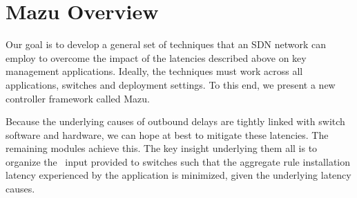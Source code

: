 \section{Mazu Overview}

Our goal is to develop a general set of techniques that an SDN network can
employ to overcome the impact of the latencies described above on key management
applications. Ideally, the techniques must work across all applications,
switches and deployment settings. To this end, we present a new controller framework called Mazu.



Because the underlying causes of outbound delays are tightly linked with
switch software and hardware, we can hope at best to mitigate these
latencies. The remaining modules achieve this. The key insight underlying them
all is to organize the \flowmod\ input provided to switches such that the
aggregate rule installation latency experienced by the application is minimized,
given the underlying latency causes. 



